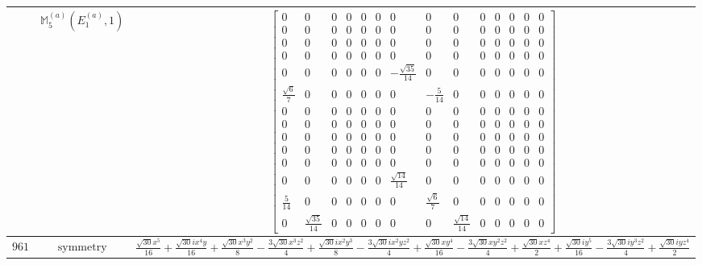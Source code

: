 \documentclass[fleqn,8pt,landscape]{jsarticle}
\begin{document}
\begin{longtable}{ccc}
$  $ & $ \mathbb{M}_{5}^{(a)}(E_{1}^{(a)},1) $ & $ \begin{bmatrix} 0 & 0 & 0 & 0 & 0 & 0 & 0 & 0 & 0 & 0 & 0 & 0 & 0 & 0 \\ 0 & 0 & 0 & 0 & 0 & 0 & 0 & 0 & 0 & 0 & 0 & 0 & 0 & 0 \\ 0 & 0 & 0 & 0 & 0 & 0 & 0 & 0 & 0 & 0 & 0 & 0 & 0 & 0 \\ 0 & 0 & 0 & 0 & 0 & 0 & 0 & 0 & 0 & 0 & 0 & 0 & 0 & 0 \\ 0 & 0 & 0 & 0 & 0 & 0 & - \frac{\sqrt{35}}{14} & 0 & 0 & 0 & 0 & 0 & 0 & 0 \\ \frac{\sqrt{6}}{7} & 0 & 0 & 0 & 0 & 0 & 0 & - \frac{5}{14} & 0 & 0 & 0 & 0 & 0 & 0 \\ 0 & 0 & 0 & 0 & 0 & 0 & 0 & 0 & 0 & 0 & 0 & 0 & 0 & 0 \\ 0 & 0 & 0 & 0 & 0 & 0 & 0 & 0 & 0 & 0 & 0 & 0 & 0 & 0 \\ 0 & 0 & 0 & 0 & 0 & 0 & 0 & 0 & 0 & 0 & 0 & 0 & 0 & 0 \\ 0 & 0 & 0 & 0 & 0 & 0 & 0 & 0 & 0 & 0 & 0 & 0 & 0 & 0 \\ 0 & 0 & 0 & 0 & 0 & 0 & 0 & 0 & 0 & 0 & 0 & 0 & 0 & 0 \\ 0 & 0 & 0 & 0 & 0 & 0 & \frac{\sqrt{14}}{14} & 0 & 0 & 0 & 0 & 0 & 0 & 0 \\ \frac{5}{14} & 0 & 0 & 0 & 0 & 0 & 0 & \frac{\sqrt{6}}{7} & 0 & 0 & 0 & 0 & 0 & 0 \\ 0 & \frac{\sqrt{35}}{14} & 0 & 0 & 0 & 0 & 0 & 0 & \frac{\sqrt{14}}{14} & 0 & 0 & 0 & 0 & 0 \end{bmatrix} $ \\ \hline
$ 961 $ & $ \text{symmetry} $ & $ \frac{\sqrt{30} x^{5}}{16} + \frac{\sqrt{30} i x^{4} y}{16} + \frac{\sqrt{30} x^{3} y^{2}}{8} - \frac{3 \sqrt{30} x^{3} z^{2}}{4} + \frac{\sqrt{30} i x^{2} y^{3}}{8} - \frac{3 \sqrt{30} i x^{2} y z^{2}}{4} + \frac{\sqrt{30} x y^{4}}{16} - \frac{3 \sqrt{30} x y^{2} z^{2}}{4} + \frac{\sqrt{30} x z^{4}}{2} + \frac{\sqrt{30} i y^{5}}{16} - \frac{3 \sqrt{30} i y^{3} z^{2}}{4} + \frac{\sqrt{30} i y z^{4}}{2} $ \\

\end{longtable}
\end{document}
